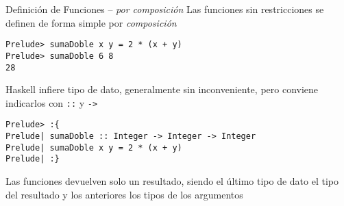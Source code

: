 



\begin{frame}[fragile]{Definición de Funciones -- \emph{por composición}}
    Las funciones sin restricciones se definen de forma simple por \emph{composición}
    \begin{lstlisting}[style=consola]
Prelude> sumaDoble x y = 2 * (x + y)
Prelude> sumaDoble 6 8
28
    \end{lstlisting}
    Haskell infiere tipo de dato, generalmente sin inconveniente,
    pero conviene indicarlos con \verb|::| y \verb|->| 
    \begin{lstlisting}[style=consola]
Prelude> :{
Prelude| sumaDoble :: Integer -> Integer -> Integer
Prelude| sumaDoble x y = 2 * (x + y)
Prelude| :}
    \end{lstlisting}
    Las funciones devuelven solo un resultado, siendo el último tipo de dato el tipo del resultado y los anteriores los tipos de los argumentos
\end{frame}

